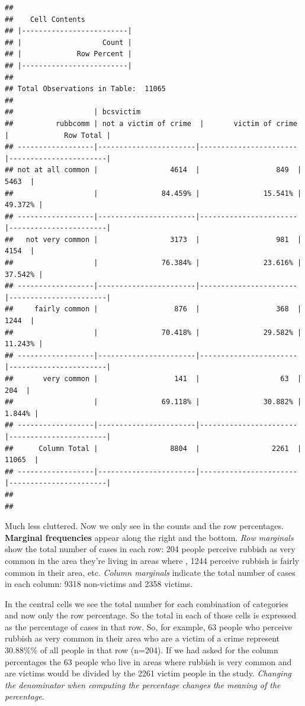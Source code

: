 \documentclass[
]{book}
\begin{document}
\begin{verbatim}
## 
##    Cell Contents
## |-------------------------|
## |                   Count |
## |             Row Percent |
## |-------------------------|
## 
## Total Observations in Table:  11065 
## 
##                   | bcsvictim 
##          rubbcomm | not a victim of crime  |       victim of crime  |             Row Total | 
## ------------------|-----------------------|-----------------------|-----------------------|
## not at all common |                 4614  |                  849  |                 5463  | 
##                   |               84.459% |               15.541% |               49.372% | 
## ------------------|-----------------------|-----------------------|-----------------------|
##   not very common |                 3173  |                  981  |                 4154  | 
##                   |               76.384% |               23.616% |               37.542% | 
## ------------------|-----------------------|-----------------------|-----------------------|
##     fairly common |                  876  |                  368  |                 1244  | 
##                   |               70.418% |               29.582% |               11.243% | 
## ------------------|-----------------------|-----------------------|-----------------------|
##       very common |                  141  |                   63  |                  204  | 
##                   |               69.118% |               30.882% |                1.844% | 
## ------------------|-----------------------|-----------------------|-----------------------|
##      Column Total |                 8804  |                 2261  |                11065  | 
## ------------------|-----------------------|-----------------------|-----------------------|
## 
## 
\end{verbatim}

Much less cluttered. Now we only see in the counts and the row percentages. \textbf{Marginal frequencies} appear along the right and the bottom. \emph{Row marginals} show the total number of cases in each row: 204 people perceive rubbish as very common in the area they're living in areas where , 1244 perceive rubbish is fairly common in their area, etc. \emph{Column marginals} indicate the total number of cases in each column: 9318 non-victims and 2358 victims.

In the central cells we see the total number for each combination of categories and now only the row percentage. So the total in each of those cells is expressed as the percentage of cases in that row. So, for example, 63 people who perceive rubbish as very common in their area who are a victim of a crime represent 30.88\%\% of all people in that row (n=204). If we had asked for the column percentages the 63 people who live in areas where rubbish is very common and are victims would be divided by the 2261 victim people in the study. \emph{Changing the denominator when computing the percentage changes the meaning of the percentage}.
\end{document}
